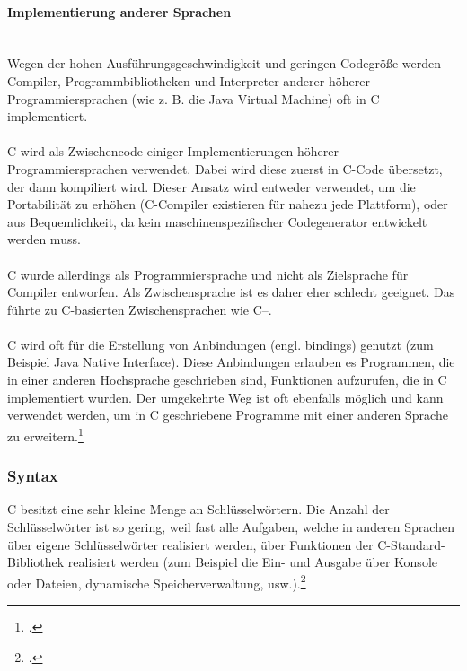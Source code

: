 \paragraph{Implementierung anderer Sprachen}
\ \\
Wegen der hohen Ausführungsgeschwindigkeit und geringen Codegröße werden Compiler, Programmbibliotheken und Interpreter anderer höherer Programmiersprachen (wie z. B. die Java Virtual Machine) oft in C implementiert.\\
\\
C wird als Zwischencode einiger Implementierungen höherer Programmiersprachen verwendet. Dabei wird diese zuerst in C-Code übersetzt, der dann kompiliert wird. Dieser Ansatz wird entweder verwendet, um die Portabilität zu erhöhen (C-Compiler existieren für nahezu jede Plattform), oder aus Bequemlichkeit, da kein maschinenspezifischer Codegenerator entwickelt werden muss.\\
\\
C wurde allerdings als Programmiersprache und nicht als Zielsprache für Compiler entworfen. Als Zwischensprache ist es daher eher schlecht geeignet. Das führte zu C-basierten Zwischensprachen wie C--.\\
\\
C wird oft für die Erstellung von Anbindungen (engl. bindings) genutzt (zum Beispiel Java Native Interface). Diese Anbindungen erlauben es Programmen, die in einer anderen Hochsprache geschrieben sind, Funktionen aufzurufen, die in C implementiert wurden. Der umgekehrte Weg ist oft ebenfalls möglich und kann verwendet werden, um in C geschriebene Programme mit einer anderen Sprache zu erweitern.\footcite{c_wiki}\\

\subsubsection{Syntax}

C besitzt eine sehr kleine Menge an Schlüsselwörtern. Die Anzahl der Schlüsselwörter ist so gering, weil fast alle Aufgaben, welche in anderen Sprachen über eigene Schlüsselwörter realisiert werden, über Funktionen der C-Standard-Bibliothek realisiert werden (zum Beispiel die Ein- und Ausgabe über Konsole oder Dateien, dynamische Speicherverwaltung, usw.).\footcite{c_wiki}\\

